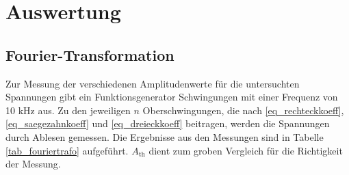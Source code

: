 \section{Auswertung}
\subsection{Fourier-Transformation}
Zur Messung der verschiedenen Amplitudenwerte für die untersuchten Spannungen gibt ein Funktionsgenerator Schwingungen mit einer
Frequenz von 10 kHz aus. Zu den jeweiligen $n$ Oberschwingungen, die nach \eqref{eq_rechteckkoeff}, \eqref{eq_saegezahnkoeff} und
\eqref{eq_dreieckkoeff} beitragen, werden die Spannungen durch Ablesen gemessen. Die Ergebnisse aus den Messungen sind in Tabelle 
\ref{tab_fouriertrafo} aufgeführt. $A_{\text{th}}$ dient zum groben Vergleich für die Richtigkeit der Messung.

